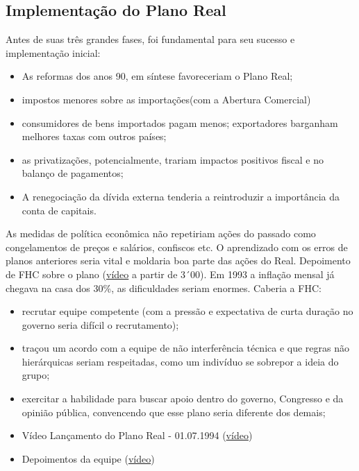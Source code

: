 \documentclass[a4paper,12pt]{article}[abntex2]
\begin{document}
\subsection{\textbf{Implementação do Plano Real}}
Antes de suas três grandes fases, foi fundamental para seu sucesso e implementação inicial:\begin{itemize}
    \item As reformas dos anos 90, em síntese favoreceriam o Plano Real;
    \item impostos menores sobre as importações(com a Abertura Comercial)
    \item consumidores de bens importados pagam menos; exportadores barganham melhores taxas com outros países; 
    \item as privatizações, potencialmente, trariam impactos positivos fiscal e no balanço de pagamentos;
    \item A renegociação da dívida externa tenderia a reintroduzir a importância da conta de capitais.
\end{itemize}

As medidas de política econômica não repetiriam ações do passado como congelamentos de preços e salários, confiscos etc. O aprendizado com os erros de planos anteriores seria vital e moldaria boa parte das ações do Real. Depoimento de FHC sobre o plano (\href{https://www.youtube.com/watch?v=K_PhYIs5FLc}{vídeo} a partir de 3´00). Em 1993 a inflação mensal já chegava na casa dos 30\%, as dificuldades seriam enormes. Caberia a FHC:\begin{itemize}
    \item recrutar equipe competente (com a pressão e expectativa de curta duração no governo seria difícil o recrutamento);
    \item traçou um acordo com a equipe de não interferência técnica e que regras não hierárquicas seriam respeitadas, como um indivíduo se sobrepor a ideia do grupo;
    \item exercitar a habilidade para buscar apoio dentro do governo, Congresso e da opinião pública, convencendo que esse plano seria diferente dos demais;
    \item Vídeo Lançamento do Plano Real - 01.07.1994 (\href{https://www.youtube.com/watch?v=Wxq6WbD8tw4}{vídeo})
    \item Depoimentos da equipe (\href{https://www.youtube.com/watch?v=AlFOWRIdyao}{vídeo})
\end{itemize}
\end{document}
